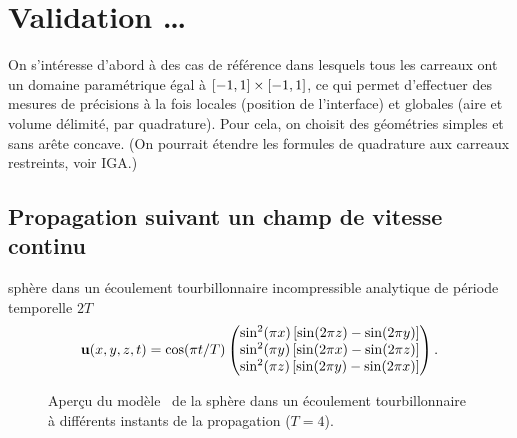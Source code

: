 \chapter{Validation \ldots}

On s'intéresse d'abord à des cas de référence dans lesquels tous les carreaux ont un domaine paramétrique égal à $\left[ -1, 1 \right] \times \left[ -1, 1 \right]$, ce qui permet d'effectuer des mesures de précisions à la fois locales (position de l'interface) et globales (aire et volume délimité, par quadrature). 
Pour cela, on choisit des géométries simples et sans arête concave.
(On pourrait étendre les formules de quadrature aux carreaux restreints, voir IGA.)

\section{Propagation suivant un champ de vitesse continu}

sphère dans un écoulement tourbillonnaire incompressible analytique de période temporelle $2T$
\begin{equation}
	\mathbf{u}(x,y,z,t) = 
	\cos( \pi t/T )
	\begin{pmatrix} 
	\sin^2(\pi x) \left[ \sin(2\pi z) - \sin(2\pi y)\right] \\
\sin^2(\pi y) \left[ \sin(2\pi x) - \sin(2\pi z)\right] \\
\sin^2(\pi z) \left[ \sin(2\pi y) - \sin(2\pi x)\right]
	 \end{pmatrix}.
\end{equation}

\begin{figure}
	\centering
	
	\caption{Aperçu du modèle \brep\ de la sphère dans un écoulement tourbillonnaire à différents instants de la propagation ($T=4$).}
	\label{fig:snapshots_vortex}
\end{figure}

